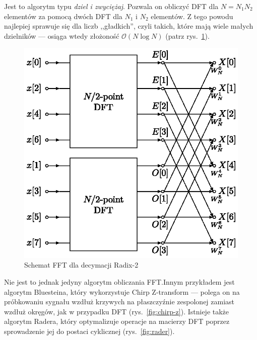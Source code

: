 \documentclass[polish, titlepage, 12pt]{article}
\begin{document}
Jest to algorytm typu \textit{dziel i zwyciężaj}. Pozwala on obliczyć DFT dla
\(N = N_1 N_2\) elementów za pomocą dwóch DFT dla \(N_1\) i \(N_2\) elementów.
Z tego powodu najlepiej sprawuje się dla liczb ,,gładkich'', czyli takich, które mają
wiele małych dzielników --- osiąga wtedy złożoność \( \mathcal{O}(N \log N) \)
(patrz rys.\ \ref{fig:fft-diagram-radix2}).

\begin{figure}[htbp]
    \centering
    \includegraphics[width=0.5\linewidth]{img/fft-diagram.eps}
    \caption{Schemat FFT dla decymacji Radix-2}\label{fig:fft-diagram-radix2}
\end{figure}

Nie jest to jednak jedyny algorytm obliczania FFT.\@ Innym przykładem jest algorytm Bluesteina,
który wykorzystuje Chirp Z-transform --- polega on na próbkowaniu sygnału wzdłuż krzywych
na płaszczyźnie zespolonej zamiast wzdłuż okręgów, jak w przypadku DFT (rys.\ \ref{fig:chirp-z}).
Istnieje także algorytm Radera, który optymalizuje operacje na macierzy DFT poprzez sprowadzenie
jej do postaci cyklicznej (rys.\ \ref{fig:rader}).
\end{document}

